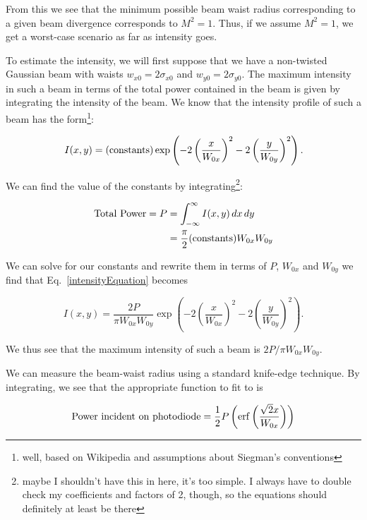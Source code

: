 From this we see that the minimum possible beam waist radius corresponding to a given beam divergence corresponds to $M^2=1$. Thus, if we assume $M^2=1$, we get a worst-case scenario as far as intensity goes. 

To estimate the intensity, we will first suppose that we have a non-twisted Gaussian beam with waists $w_{x0}=2 \sigma_{x0}$ and $w_{y0}=2 \sigma_{y0}$. The maximum intensity in such a beam in terms of the total power contained in the beam is given by integrating the intensity of the beam. We know that the intensity profile of such a beam has the form\footnote{well, based on Wikipedia and assumptions about Siegman's conventions}:

\begin{equation}
I(x,y)=({\rm constants}) \exp \left( -2 \left(\frac{x}{W_{0x}} \right)^2-2 \left( \frac{y}{W_{0y}}\right)^2\right). \label{intensityEquation}
\end{equation}

We can find the value of the constants by integrating\footnote{maybe I shouldn't have this in here, it's too simple. I always have to double check my coefficients and factors of 2, though, so the equations should definitely at least be there}: 

\begin{align}
{\rm Total\ Power}=P&=\int_{-\infty}^\infty I(x,y)\, dx\, dy\\
&=\frac{\pi}{2}({\rm constants}) W_{0x} W_{0y}
\end{align}

We can solve for our constants and rewrite them in terms of $P$, $W_{0x}$ and $W_{0y}$ we find that Eq.\ \ref{intensityEquation} becomes 

\begin{equation}
I(x,y)= \frac{2 P}{\pi W_{0x} W_{0y}}\exp \left( -2 \left(\frac{x}{W_{0x}} \right)^2-2 \left( \frac{y}{W_{0y}}\right)^2\right). \label{intensityEquation2}
\end{equation}

We thus see that the maximum intensity of such a beam is $2P/\pi W_{0x}W_{0y}$.

We can measure the beam-waist radius using a standard knife-edge technique. By integrating, we see that the appropriate function to fit to is 

\begin{equation}
{\rm Power\ incident\ on\ photodiode}=\frac{1}{2} P \left(\erf \left( \frac{\sqrt{2} x}{W_{0x}}\right)\right)
\end{equation}


